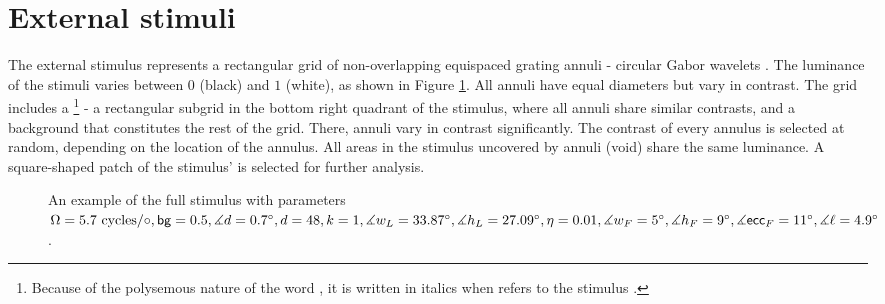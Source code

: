 \section{External stimuli}
\label{sec:external-stimuli}

The external stimulus represents a rectangular grid of non-overlapping equispaced grating annuli - circular Gabor wavelets \cite{MaryamPLACEHOLDER}. The luminance of the stimuli varies between $0$ (black) and $1$ (white), as shown in Figure \ref{fig:full-stimulus-example}. All annuli have equal diameters but vary in contrast. The grid includes a \stimfig{}\footnote{Because of the polysemous nature of the word , it is written in italics when refers to the stimulus \stimfig.} - a rectangular subgrid in the bottom right quadrant of the stimulus, where all annuli share similar contrasts, and a background that constitutes the rest of the grid. There, annuli vary in contrast significantly. The contrast of every annulus is selected at random, depending on the location of the annulus. All areas in the stimulus uncovered by annuli (void) share the same luminance. A square-shaped patch of the stimulus' \stimfig{} is selected for further analysis.

\begin{figure}[!htp]
    \centering
    
    \caption[Full stimulus annotated]{An example of the full stimulus with parameters $ \Omega = 5.7 \text{ cycles}/\circ, \mathsf{bg} = 0.5, \measuredangle d = 0.7^\circ, d = 48, k = 1, \measuredangle w_L = 33.87^\circ, \measuredangle h_L = 27.09^\circ, \eta = 0.01, \measuredangle w_F = 5^\circ, \measuredangle h_F = 9^\circ, \measuredangle \mathsf{ecc}_F = 11^\circ, \measuredangle \ell = 4.9^\circ$.}
    \label{fig:full-stimulus-example}
\end{figure}



